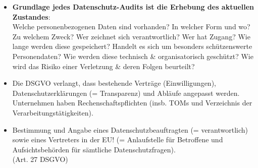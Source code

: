 \begin{itemize}
	\tightlist
	\item \textbf{Grundlage jedes Datenschutz-Audits ist die Erhebung des
	aktuellen Zustandes}:\\
	Welche personenbezogenen Daten sind vorhanden? In welcher Form und wo?
	Zu welchem Zweck? Wer zeichnet sich verantwortlich? Wer hat Zugang? Wie
	lange werden diese gespeichert? Handelt es sich um besonders
	schützenswerte Personendaten? Wie werden diese technisch \&
	organisatorisch geschützt? Wie wird das Risiko einer Verletzung \& deren
	Folgen beurteilt?
	\item Die DSGVO verlangt, dass bestehende Verträge (Einwilligungen),
	Datenschutzerklärungen (= Transparenz) und Abläufe angepasst werden. 
	Unternehmen	haben Rechenschaftspflichten (insb. TOMs und Verzeichnis der
	Verarbeitungstätigkeiten).
	\item Bestimmung und Angabe eines Datenschutzbeauftragten (= verantwortlich)
	sowie eines Vertreters in der EU! (= Anlaufstelle für Betroffene und 
	Aufsichtsbehörden für sämtliche	Datenschutzfragen).\\
	(Art. 27 DSGVO)
\end{itemize}

